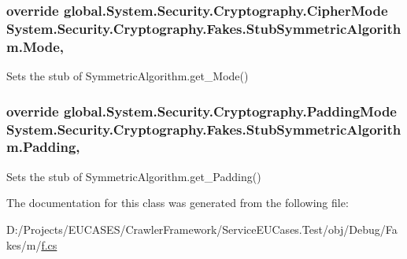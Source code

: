 \hypertarget{class_system_1_1_security_1_1_cryptography_1_1_fakes_1_1_stub_symmetric_algorithm_af72cb6f6cd2f81df196e1025ac98db92}{
\subsubsection[{Mode}]{\setlength{\rightskip}{0pt plus 5cm}override global.\-System.\-Security.\-Cryptography.\-Cipher\-Mode System.\-Security.\-Cryptography.\-Fakes.\-Stub\-Symmetric\-Algorithm.\-Mode\hspace{0.3cm}{\ttfamily [get]}, {\ttfamily [set]}}}\label{class_system_1_1_security_1_1_cryptography_1_1_fakes_1_1_stub_symmetric_algorithm_af72cb6f6cd2f81df196e1025ac98db92}


Sets the stub of Symmetric\-Algorithm.\-get\-\_\-\-Mode()

\hypertarget{class_system_1_1_security_1_1_cryptography_1_1_fakes_1_1_stub_symmetric_algorithm_acd823f53616acf9908a7d34956769082}{
\subsubsection[{Padding}]{\setlength{\rightskip}{0pt plus 5cm}override global.\-System.\-Security.\-Cryptography.\-Padding\-Mode System.\-Security.\-Cryptography.\-Fakes.\-Stub\-Symmetric\-Algorithm.\-Padding\hspace{0.3cm}{\ttfamily [get]}, {\ttfamily [set]}}}\label{class_system_1_1_security_1_1_cryptography_1_1_fakes_1_1_stub_symmetric_algorithm_acd823f53616acf9908a7d34956769082}


Sets the stub of Symmetric\-Algorithm.\-get\-\_\-\-Padding()



The documentation for this class was generated from the following file\-:\begin{DoxyCompactItemize}
\item 
D\-:/\-Projects/\-E\-U\-C\-A\-S\-E\-S/\-Crawler\-Framework/\-Service\-E\-U\-Cases.\-Test/obj/\-Debug/\-Fakes/m/\hyperlink{m_2f_8cs}{f.\-cs}\end{DoxyCompactItemize}
